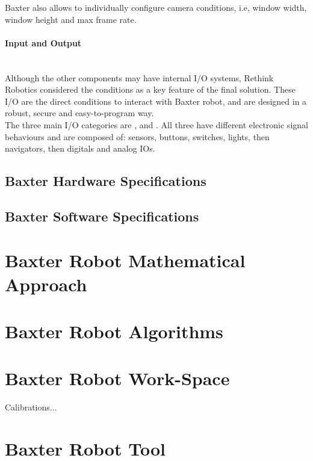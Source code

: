 \documentclass[11pt]{report} %
\newcommand{\subsubsubsection}[1]{\paragraph{#1}\mbox{}\\}
\begin{document}
Baxter also allows to individually configure camera conditions, i.e, window width, window height and max frame rate.\\


\subsubsubsection{Input and Output}

Although the other components may have internal I/O systems, Rethink Robotics considered the  conditions as a key feature of the final solution. These I/O are the direct conditions to interact with Baxter robot, and are designed in a robust, secure and easy-to-program way.\\

The three main I/O categories are ,  and  \citep{cite_baxter_io_wiki}. All three have different electronic signal behaviours and are composed of: sensors, buttons, switches, lights, then navigators, then digitals and analog IOs.\\


\subsection{Baxter Hardware Specifications}

\subsection{Baxter Software Specifications}



\section{Baxter Robot Mathematical Approach}

\section{Baxter Robot Algorithms}

\section{Baxter Robot Work-Space}

Calibrations...

\section{Baxter Robot Tool}

\end{document}
